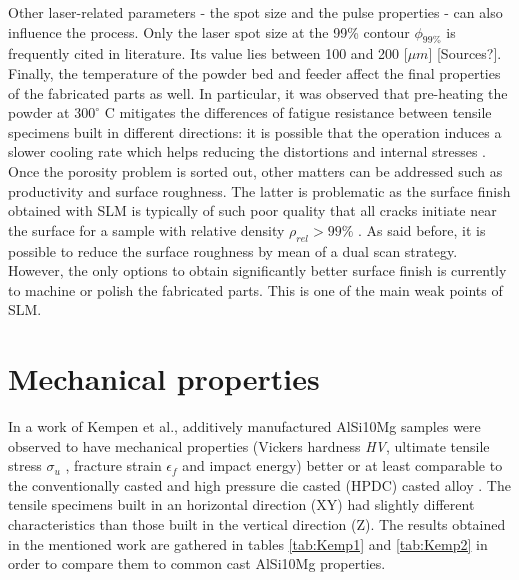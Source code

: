 Other laser-related parameters - the spot size and the pulse properties - can also influence the process. Only the laser spot size at the 99\% contour $\phi_{99\%}$ is frequently cited in literature. Its value lies between 100 and 200 [$\mu m$] [Sources?].\\

Finally, the temperature of the powder bed and feeder affect the final properties of the fabricated parts as well. In particular, it was observed that pre-heating the powder at $300^\circ$ C mitigates the differences of fatigue resistance between tensile specimens built in different directions: it is possible that the operation induces a slower cooling rate which helps reducing the distortions and internal stresses \parencite{Brandl121509}.\\

Once the porosity problem is sorted out, other matters can be addressed such as productivity and surface roughness. The latter is problematic as the surface finish obtained with SLM is typically of such poor quality that all cracks initiate near the surface for a sample with relative density $\rho_{rel}>99\%$ \parencite{Brandl121509}. As said before, it is possible to reduce the surface roughness by mean of a dual scan strategy. However, the only options to obtain significantly better surface finish is currently to machine or polish the fabricated parts. This is one of the main weak points of SLM.\\ %

\section{Mechanical properties}

In a work of Kempen et al., additively manufactured AlSi10Mg samples were observed to have mechanical properties (Vickers hardness \textit{HV}, ultimate tensile stress $\sigma_u$ , fracture strain $\epsilon_f$ and impact energy) better or at least comparable to the conventionally casted and high pressure die casted (HPDC) casted alloy \parencite{KEMPEN2012439}. The tensile specimens built in an horizontal direction (XY) had slightly different characteristics than those built in the vertical direction (Z). The results obtained in the mentioned work are gathered in tables \ref{tab:Kemp1} and \ref{tab:Kemp2}  in order to compare them to common cast AlSi10Mg properties.

